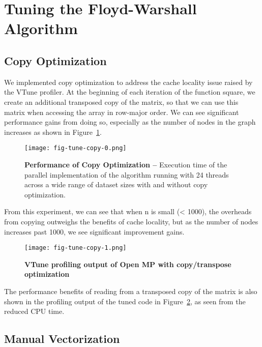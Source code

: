 
\clearpage
\section{Tuning the Floyd-Warshall Algorithm}
\label{sec-tune}

\subsection{Copy Optimization}
\label{sec-tune-copy}

We implemented copy optimization to address the cache locality issue
raised by the VTune profiler. At the beginning of each iteration of the
function square, we create an additional transposed copy of the matrix,
so that we can use this matrix when accessing the array in row-major
order. We can see significant performance gains from doing so, especially
as the number of nodes in the graph increases as shown in
Figure~\ref{fig-tune-copy-0}.

\begin{figure}[h]
  \centering
  \texttt{[image: fig-tune-copy-0.png]}
  \caption{\textbf{Performance of Copy Optimization --} Execution time of
    the parallel implementation of the algorithm running with 24 threads
    across a wide range of dataset sizes with and without copy
    optimization.}
  \label{fig-tune-copy-0}
\end{figure}

From this experiment, we can see that when n is small (< 1000), the
overheads from copying outweighs the benefits of cache locality, but as
the number of nodes increases past 1000, we see significant improvement
gains.

\begin{figure}[h]
  \centering
  \texttt{[image: fig-tune-copy-1.png]}
  \caption{\textbf{VTune profiling output of Open MP with copy/transpose
      optimization}}
  \label{fig-tune-copy-1}
\end{figure}

The performance benefits of reading from a transposed copy of the matrix
is also shown in the profiling output of the tuned code in
Figure~\ref{fig-tune-copy-1}, as seen from the reduced CPU time.

\subsection{Manual Vectorization}
\label{sec-tune-vector}

